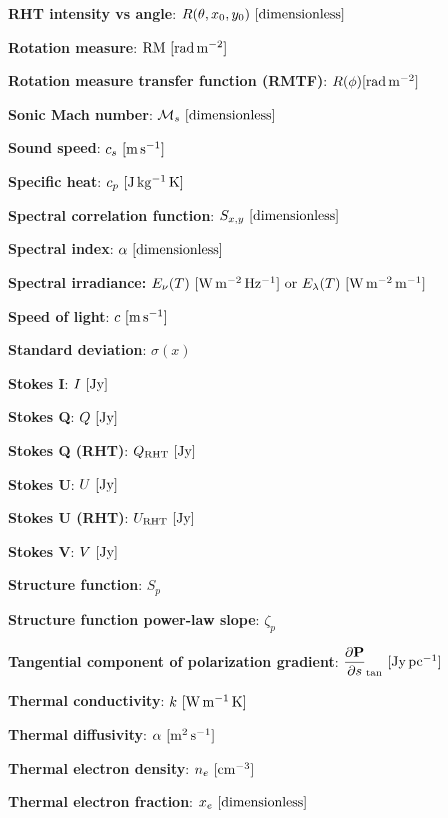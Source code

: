 \documentclass[a4paper,10pt]{article}
\begin{document}
{\noindent}\textbf{RHT intensity vs angle}: $R(\theta,x_0,y_0)~[{\rm dimensionless}]$

{\noindent}\textbf{Rotation measure}: ${\rm RM~[rad\,m^{-2}]}$

{\noindent}\textbf{Rotation measure transfer function (RMTF)}: $R(\phi) {\rm [rad\,m^{-2}]}$

{\noindent}\textbf{Sonic Mach number}: $\mathcal{M}_s~[{\rm dimensionless]}$

{\noindent}\textbf{Sound speed}: $c_s ~ [{\rm m\,s^{-1}}]$

{\noindent}\textbf{Specific heat}: $c_p ~ [{\rm J\,kg^{-1}\,K}]$

{\noindent}\textbf{Spectral correlation function}: $S_{x,y}~[\rm{dimensionless}]$

{\noindent}\textbf{Spectral index}: $\alpha~[\rm{dimensionless}]$

{\noindent}\textbf{Spectral irradiance:} $E_\nu(T)~[{\rm W\,m^{-2}\,Hz^{-1}}]~{\rm or}~E_\lambda(T)~[{\rm W\,m^{-2}\,m^{-1}}]$

{\noindent}\textbf{Speed of light}: $c~[\rm{m\,s^{-1}}]$

{\noindent}\textbf{Standard deviation}: $\sigma(x)$

{\noindent}\textbf{Stokes I}: $I ~ [\rm Jy]$

{\noindent}\textbf{Stokes Q}: $Q ~ [\rm Jy]$

{\noindent}\textbf{Stokes Q (RHT)}: $Q_\mathrm{RHT} ~ [\rm Jy]$

{\noindent}\textbf{Stokes U}: $U ~ [\rm Jy]$

{\noindent}\textbf{Stokes U (RHT)}: $U_\mathrm{RHT} ~ [\rm Jy]$

{\noindent}\textbf{Stokes V}: $V ~ [\rm Jy]$

{\noindent}\textbf{Structure function}: $S_p$

{\noindent}\textbf{Structure function power-law slope}: $\zeta_p$

{\noindent}\textbf{Tangential component of polarization gradient}: $\dfrac{\partial\mathbf{P}}{\partial s}_\mathrm{tan} ~ [{\rm Jy\,pc^{-1}}]$

{\noindent}\textbf{Thermal conductivity}: $k ~ [{\rm W\,m^{-1}\,K}]$

{\noindent}\textbf{Thermal diffusivity}: $\alpha ~ [{\rm m^2\,s^{-1}}]$

{\noindent}\textbf{Thermal electron density}: $n_e~[{\rm cm^{-3}}]$

{\noindent}\textbf{Thermal electron fraction}: $x_e ~ [{\rm dimensionless}]$
\end{document}
